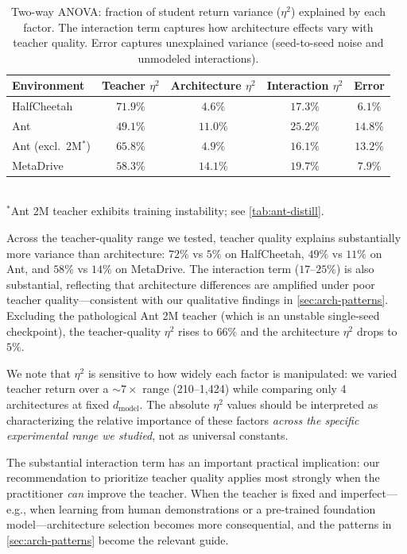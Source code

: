 \begin{table}[ht]
\centering
\caption{Two-way ANOVA: fraction of student return variance ($\eta^2$) explained by each factor. The interaction term captures how architecture effects vary with teacher quality. Error captures unexplained variance (seed-to-seed noise and unmodeled interactions).}
\label{tab:anova}
\begin{tabular}{lcccc}
\toprule
Environment & Teacher $\eta^2$ & Architecture $\eta^2$ & Interaction $\eta^2$ & Error \\
\midrule
HalfCheetah & $71.9\%$ & $4.6\%$ & $17.3\%$ & $6.1\%$ \\
Ant         & $49.1\%$ & $11.0\%$ & $25.2\%$ & $14.8\%$ \\
Ant (excl.\ 2M$^*$) & $65.8\%$ & $4.9\%$ & $16.1\%$ & $13.2\%$ \\
MetaDrive   & $58.3\%$ & $14.1\%$ & $19.7\%$ & $7.9\%$ \\
\bottomrule
\end{tabular}
\\[2pt]
{\small $^*$Ant 2M teacher exhibits training instability; see \cref{tab:ant-distill}.}
\end{table}

Across the teacher-quality range we tested, teacher quality explains substantially more variance than architecture: $72\%$ vs $5\%$ on HalfCheetah, $49\%$ vs $11\%$ on Ant, and $58\%$ vs $14\%$ on MetaDrive.
The interaction term ($17$--$25\%$) is also substantial, reflecting that architecture differences are amplified under poor teacher quality---consistent with our qualitative findings in \cref{sec:arch-patterns}.
Excluding the pathological Ant 2M teacher (which is an unstable single-seed checkpoint), the teacher-quality $\eta^2$ rises to $66\%$ and the architecture $\eta^2$ drops to $5\%$.

We note that $\eta^2$ is sensitive to how widely each factor is manipulated: we varied teacher return over a ${\sim}7\times$ range (210--1{,}424) while comparing only 4 architectures at fixed $d_\text{model}$.
The absolute $\eta^2$ values should be interpreted as characterizing the relative importance of these factors \emph{across the specific experimental range we studied}, not as universal constants.

The substantial interaction term has an important practical implication: our recommendation to prioritize teacher quality applies most strongly when the practitioner \emph{can} improve the teacher.
When the teacher is fixed and imperfect---e.g., when learning from human demonstrations or a pre-trained foundation model---architecture selection becomes more consequential, and the patterns in \cref{sec:arch-patterns} become the relevant guide.

